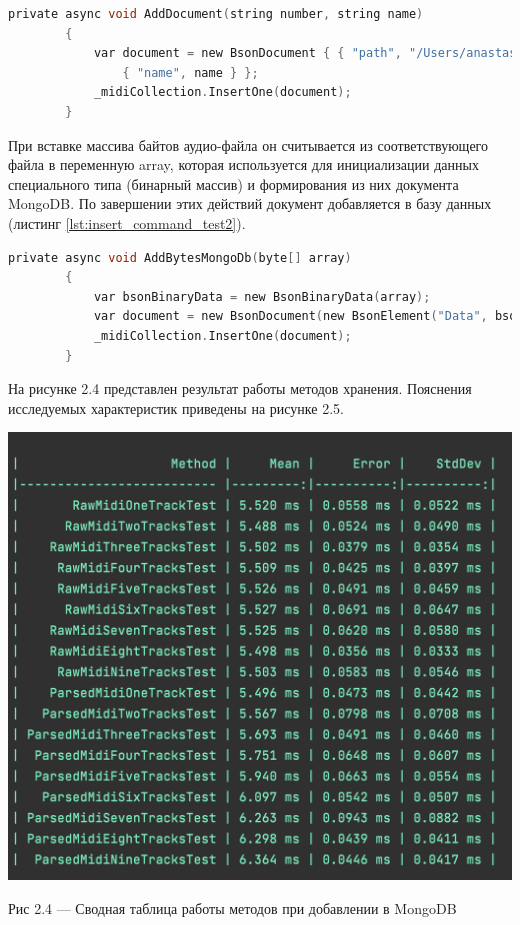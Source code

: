 \newpage{}

\begin{lstlisting}[language=C, label=some-code, caption=Добавление MIDI-файла в MongoDB c использованием реализованного метода, label=lst:insert_command_test1]
private async void AddDocument(string number, string name)
        {
            var document = new BsonDocument { { "path", "/Users/anastasia/Desktop/Audiofiles/Interstellar" + number + ".mid" }, 
                { "name", name } };
            _midiCollection.InsertOne(document);
        }
\end{lstlisting}

При вставке массива байтов аудио-файла он считывается из соответствующего файла в переменную array, которая используется для инициализации данных специального типа (бинарный массив) и формирования из них документа MongoDB. По завершении этих действий документ добавляется в базу данных (листинг \ref{lst:insert_command_test2}).

\begin{lstlisting}[language=C, label=some-code, caption=Добавление MIDI-файла в MongoDB в виде массива байтов, label=lst:insert_command_test2]
private async void AddBytesMongoDb(byte[] array)
        {
            var bsonBinaryData = new BsonBinaryData(array);
            var document = new BsonDocument(new BsonElement("Data", bsonBinaryData));
            _midiCollection.InsertOne(document);
        }
\end{lstlisting}

На рисунке 2.4 представлен результат работы методов хранения. Пояснения исследуемых характеристик приведены на рисунке 2.5.

\begin{center}
		\includegraphics[scale=0.6]{tex/img/InsertClean.png}
		
			Рис 2.4 — Сводная таблица работы методов при добавлении в MongoDB
\end{center}

